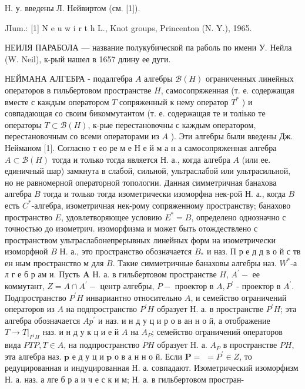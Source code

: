 \documentclass[10pt]{article}
\begin{document}
Н. у. введены Л. Нейвиртом (см. [1]).



JIum.: [1] N e u w i r t h L., Knot groups, Princenton (N. Y.), 1965.

НЕИЛЯ ПАРАБОЛА — название полукубической па раболь по имени У. Нейла (W. Neil), к-рый нашел в 1657 длину ее дуги.



НЕЙМАНА АЛГЕБРА - подалгебра $A$ алгебры $\mathscr{B}(H)$ ограниченных линейных операторов в гильбертовом пространстве $H$, самосопряженная (т. е. содержащая вместе с каждым оператором $T$ сопряженный к нему оператор $T^{*}$ ) и совпадающая со своим бикоммутантом (т. е. содержащая те и толіько те операторы $T \subset \mathscr{B}(H)$, к-рые перестановочны с каждым оператором, перестановочным со всеми операторами из $A$ ). Эти алгебры были введены Дж. Нейманом [1]. Согласно т ео ре м е Н е й м а н а самосопряженная алгебра $A \subset \mathscr{B}(H)$ тогда и только тогда является Н. а., когда алгебра $A$ (или ее. единичный шар) замкнута в слабой, сильной, ультраслабой или ультрасильной, но не равномерной операторной топологии. Данная симметричная банахова алгебра $B$ тогда и только тогда изометрически изоморфна нек-рой Н. а., когда $B$ есть $C^{*}$-алгебра, изометричная нек-рому сопряженному пространству; банахово пространство $E$, удовлетворяющее условию $E^{*}=B$, определено однозначно с точностью до изометрич. изоморфизма и может быть отождествлено с пространством ультраслабонепрерывных линейных форм на изометрически изоморфной $B$ Н. а., это пространство обозначается $B_{*}$ и наз. П р е д д в о й с тв ен ным пространство м для $B$. Такие симметричные банаховы алгебры наз. $W^{*}$-а л г е б р ам и. Пусть $\boldsymbol{A}$ Н. а. в гильбертовом пространстве $H$, $A^{\prime}-$ ее коммутант, $Z=A \cap A^{\prime}-$ центр алгебры, $P-$ проектор в $A, P^{\prime}$ - проектор в $A^{\prime}$. Подпространство $P^{\prime} H$ инвариантно относительно $A$, и семейство ограничений операторов из $A$ на подпространство $P^{\prime} H$ образует Н. а. в пространстве $P^{\prime} H$; эта алгебра обозначается $A p^{\prime}$ и наз. и н д у ц и р о в ан н о й, а отображение $\left.T \rightarrow T\right|_{P^{\prime} H}$ наз. и н д у к ц и е й $A$ на $A_{P}$; семейство ограничений операторов вида $P T P, T \in A$, на подпространство $P H$ образует $\mathrm{H}$. а. $A_{P}$ в пространстве $P H$, эта алгебра наз. $\mathbf{p}$ е д у ц и $\mathbf{p}$ о в а н н о й. Если $\boldsymbol{P}=$ $=P^{\prime} \in Z$, то редуцированная и индуцированная H. а. совпадают. Изометрический изоморфизм Н. а. наз. а лге б р а и ч е с к и м; Н. а. в гильбертовом простран-
\end{document}
